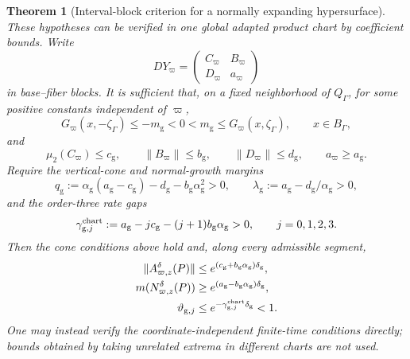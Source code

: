 \documentclass[11pt]{amsart}
\numberwithin{equation}{section}
\newtheorem{theorem}{Theorem}[section]
\theoremstyle{definition}
\theoremstyle{remark}
\begin{document}
\begin{theorem}[Interval-block criterion for a normally expanding
hypersurface]
These hypotheses can be verified in one global adapted product chart by
coefficient bounds.  Write
\[
 DY_\varpi=
 \begin{pmatrix}C_\varpi&B_\varpi\\D_\varpi&a_\varpi\end{pmatrix}
\]
in base--fiber blocks.  It is sufficient that, on a fixed neighborhood of
$Q_\Gamma$, for some positive constants independent of $\varpi$,
\begin{equation}\label{eq:alg-normal-exit-faces}
 G_\varpi(x,-\zeta_\Gamma)\le-m_{\mathrm g}<0
 <m_{\mathrm g}\le G_\varpi(x,\zeta_\Gamma),
 \qquad x\in B_\Gamma,
\end{equation}
and
\begin{equation}\label{eq:alg-block-bounds}
 \mu_2(C_\varpi)\le c_{\mathrm g},\qquad
 \|B_\varpi\|\le b_{\mathrm g},\qquad
 \|D_\varpi\|\le d_{\mathrm g},\qquad
 a_\varpi\ge a_{\mathrm g}.
\end{equation}
Require the vertical-cone and normal-growth margins
\begin{equation}\label{eq:alg-cone-growth-margins}
 q_{\mathrm g}:=\alpha_{\mathrm g}(a_{\mathrm g}-c_{\mathrm g})
       -d_{\mathrm g}-b_{\mathrm g}\alpha_{\mathrm g}^2>0,
 \qquad
 \lambda_{\mathrm g}:=a_{\mathrm g}
       -d_{\mathrm g}/\alpha_{\mathrm g}>0,
\end{equation}
and the order-three rate gaps
\begin{equation}\label{eq:alg-jet-rate-gaps}
 \gamma^{\rm chart}_{\mathrm g,j}:=a_{\mathrm g}-j c_{\mathrm g}
       -(j+1)b_{\mathrm g}\alpha_{\mathrm g}>0,
 \qquad j=0,1,2,3.
\end{equation}
Then the cone conditions above hold and, along every admissible segment,
\begin{equation}\label{eq:block-to-finite-time-bunching}
 \begin{aligned}
 \|A^\delta_{\varpi,z}(P)\|
 &\le e^{(c_{\mathrm g}+b_{\mathrm g}\alpha_{\mathrm g})\delta_{\mathrm g}},\\
 m(N^\delta_{\varpi,z}(P))
 &\ge e^{(a_{\mathrm g}-b_{\mathrm g}\alpha_{\mathrm g})\delta_{\mathrm g}},\\
 \vartheta_{\mathrm g,j}
 &\le e^{-\gamma^{\rm chart}_{\mathrm g,j}\delta_{\mathrm g}}<1.
 \end{aligned}
\end{equation}
One may instead verify the coordinate-independent finite-time conditions
directly; bounds obtained by taking unrelated extrema in different charts
are not used.


\end{theorem}
\end{document}
